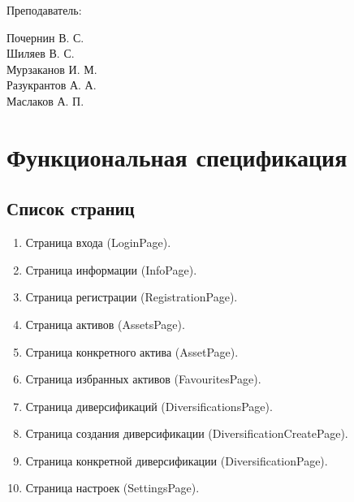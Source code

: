 \documentclass[a4paper, 14pt]{article}
\begin{document}
\begin{titlepage}
\begin{multicols}{2}
\begin{flushright}
            {Преподаватель:\\}

        \end{flushright}
        \begin{flushright}

            {Почернин В. С.}\\
            {Шиляев В. С.}\\
            {Мурзаканов И. М.}\\
            {Разукрантов А. А.}\\[0.5cm]


            Маслаков А. П.\\

        \end{flushright}
    \end{multicols}

    \flushright{
        {\phantom{qwe}}\\[0.5cm]
    }

    \vfill
\end{titlepage}

\Large
\tableofcontents
\newpage
\large

\section{Функциональная спецификация}

\subsection{Список страниц}

\begin{enumerate}
    \item Страница входа (LoginPage).
    \item Страница информации (InfoPage).
    \item Страница регистрации (RegistrationPage).
    \item Страница активов (AssetsPage).
    \item Страница конкретного актива (AssetPage).
    \item Страница избранных активов (FavouritesPage).
    \item Страница диверсификаций (DiversificationsPage).
    \item Страница создания диверсификации (DiversificationCreatePage).
    \item Страница конкретной диверсификации (DiversificationPage).
    \item Страница настроек (SettingsPage).
\end{enumerate}
\end{document}
